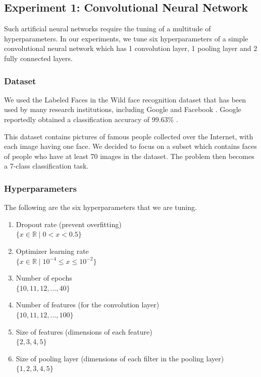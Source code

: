 \documentclass[letterpaper]{article}
\begin{document}
\subsection{Experiment 1: Convolutional Neural Network}
Such artificial neural networks require the tuning of a multitude of hyperparameters.
In our experiments, we tune six hyperparameters of a simple convolutional neural 
network which has 1 convolution layer, 1 pooling layer and 2 fully connected layers.

\subsubsection{Dataset}
We used the Labeled Faces in the Wild face recognition dataset that has been used
by many research institutions, including Google \cite{schroff2015facenet} and 
Facebook \cite{taigman2014deepface}. Google reportedly obtained a classification
accuracy of 99.63\% \cite{schroff2015facenet}.

This dataset contains pictures of famous people collected over the Internet, with 
each image having one face. We decided to focus on a subset which contains faces 
of people who have at least 70 images in the dataset. The problem then becomes 
a 7-class classification task.

\subsubsection{Hyperparameters}
The following are the six hyperparameters that we are tuning.

\begin{enumerate}

    \item Dropout rate (prevent overfitting)\\
    $\{ x \in \mathbb{R} \mid 0 < x < 0.5\}$
    \item Optimizer learning rate\\
    $\{ x \in \mathbb{R} \mid 10^{-4} \leq x \leq 10^{-2}\}$
    \item Number of epochs\\
    $\{ 10, 11, 12, \ldots, 40\}$
    \item Number of features (for the convolution layer)\\
    $\{ 10, 11, 12, \ldots, 100\}$
    \item Size of features (dimensions of each feature)\\
    $\{ 2, 3, 4, 5\}$
    \item Size of pooling layer (dimensions of each filter in the pooling layer)\\
    $\{ 1, 2, 3, 4, 5\}$

\end{enumerate}
\end{document}
